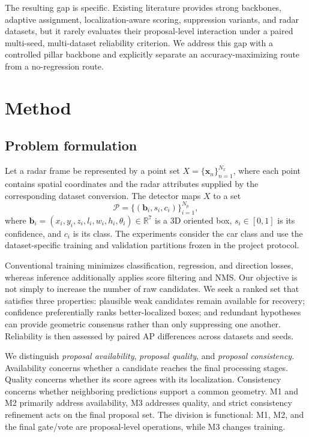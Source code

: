 \documentclass[final,5p,times]{elsarticle}
\begin{document}
The resulting gap is specific. Existing literature provides strong backbones,
adaptive assignment, localization-aware scoring, suppression variants, and
radar datasets, but it rarely evaluates their proposal-level interaction under
a paired multi-seed, multi-dataset reliability criterion. We address this gap
with a controlled pillar backbone and explicitly separate an accuracy-maximizing
route from a no-regression route.

\section{Method}

\subsection{Problem formulation}

Let a radar frame be represented by a point set
$X=\{\mathbf{x}_n\}_{n=1}^{N_x}$, where each point contains spatial
coordinates and the radar attributes supplied by the corresponding dataset
conversion. The detector maps $X$ to a set
\begin{equation}
\mathcal{P}=\{(\mathbf{b}_i,s_i,c_i)\}_{i=1}^{N_p},
\end{equation}
where $\mathbf{b}_i=(x_i,y_i,z_i,l_i,w_i,h_i,\theta_i)\in\mathbb{R}^7$
is a 3D oriented box, $s_i\in[0,1]$ is its confidence, and $c_i$ is its
class. The experiments consider the car class and use the dataset-specific
training and validation partitions frozen in the project protocol.

Conventional training minimizes classification, regression, and direction
losses, whereas inference additionally applies score filtering and NMS. Our
objective is not simply to increase the number of raw candidates. We seek a
ranked set that satisfies three properties: plausible weak candidates remain
available for recovery; confidence preferentially ranks better-localized
boxes; and redundant hypotheses can provide geometric consensus rather than
only suppressing one another. Reliability is then assessed by paired AP
differences across datasets and seeds.

We distinguish \emph{proposal availability}, \emph{proposal quality}, and
\emph{proposal consistency}. Availability concerns whether a candidate reaches
the final processing stages. Quality concerns whether its score agrees with
its localization. Consistency concerns whether neighboring predictions support
a common geometry. M1 and M2 primarily address availability, M3 addresses
quality, and strict consistency refinement acts on the final proposal set.
The division is functional: M1, M2, and the final gate/vote are proposal-level
operations, while M3 changes training.
\end{document}
